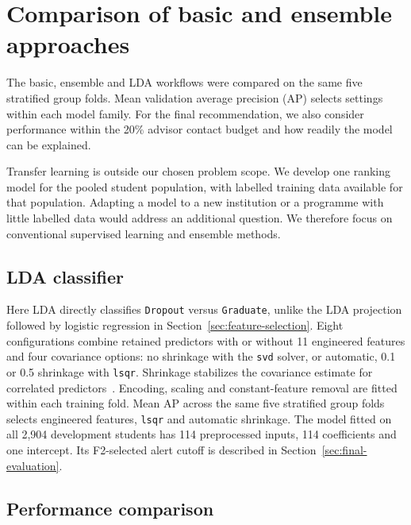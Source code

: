



\section{Comparison of basic and ensemble approaches}
\label{sec:transfer-comparison}

The basic, ensemble and LDA workflows were compared on the same five stratified
group folds. Mean validation average precision (AP) selects settings within
each model family. For the final recommendation, we also consider performance
within the 20\% advisor contact budget and how readily the model can be explained.

Transfer learning is outside our chosen problem scope. We develop one ranking
model for the pooled student population, with labelled training data available
for that population. Adapting a model to a new institution or a programme with
little labelled data would address an additional question. We therefore focus
on conventional supervised learning and ensemble methods.

\subsection{LDA classifier}
\label{sec:lda-classifier}

Here LDA directly classifies \texttt{Dropout} versus \texttt{Graduate}, unlike
the LDA projection followed by
logistic regression in Section~\ref{sec:feature-selection}.
Eight configurations combine retained predictors with or without 11 engineered
features and four covariance options: no shrinkage with the \texttt{svd} solver,
or automatic, 0.1 or 0.5 shrinkage with \texttt{lsqr}. Shrinkage stabilizes the
covariance estimate for correlated predictors~\cite{sklearn_lda}.
Encoding, scaling and constant-feature removal are fitted within each training
fold. Mean AP across the same five stratified group folds selects engineered
features, \texttt{lsqr} and automatic shrinkage. The model fitted on all 2,904
development students has 114 preprocessed inputs, 114 coefficients and one
intercept. Its F2-selected alert cutoff is described in
Section~\ref{sec:final-evaluation}.

\subsection{Performance comparison}

